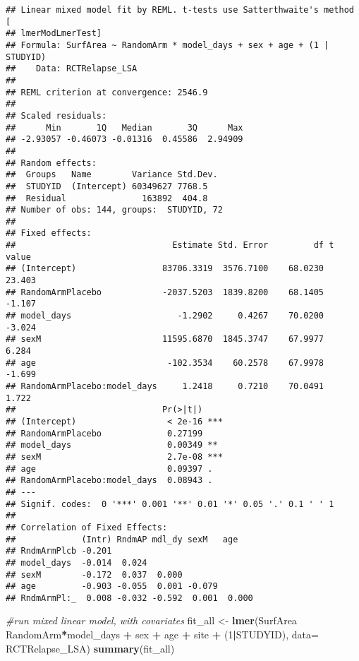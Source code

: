\documentclass[]{article}
\newenvironment{Shaded}{\begin{snugshade}}{\end{snugshade}}
\newcommand{\KeywordTok}[1]{\textcolor[rgb]{0.13,0.29,0.53}{\textbf{#1}}}
\newcommand{\DataTypeTok}[1]{\textcolor[rgb]{0.13,0.29,0.53}{#1}}
\newcommand{\DecValTok}[1]{\textcolor[rgb]{0.00,0.00,0.81}{#1}}
\newcommand{\StringTok}[1]{\textcolor[rgb]{0.31,0.60,0.02}{#1}}
\newcommand{\CommentTok}[1]{\textcolor[rgb]{0.56,0.35,0.01}{\textit{#1}}}
\newcommand{\OperatorTok}[1]{\textcolor[rgb]{0.81,0.36,0.00}{\textbf{#1}}}
\newcommand{\NormalTok}[1]{#1}
\theoremstyle{definition}
\theoremstyle{definition}
\theoremstyle{definition}
\theoremstyle{remark}
\begin{document}
\begin{verbatim}
## Linear mixed model fit by REML. t-tests use Satterthwaite's method [
## lmerModLmerTest]
## Formula: SurfArea ~ RandomArm * model_days + sex + age + (1 | STUDYID)
##    Data: RCTRelapse_LSA
## 
## REML criterion at convergence: 2546.9
## 
## Scaled residuals: 
##      Min       1Q   Median       3Q      Max 
## -2.93057 -0.46073 -0.01316  0.45586  2.94909 
## 
## Random effects:
##  Groups   Name        Variance Std.Dev.
##  STUDYID  (Intercept) 60349627 7768.5  
##  Residual               163892  404.8  
## Number of obs: 144, groups:  STUDYID, 72
## 
## Fixed effects:
##                               Estimate Std. Error         df t value
## (Intercept)                 83706.3319  3576.7100    68.0230  23.403
## RandomArmPlacebo            -2037.5203  1839.8200    68.1405  -1.107
## model_days                     -1.2902     0.4267    70.0200  -3.024
## sexM                        11595.6870  1845.3747    67.9977   6.284
## age                          -102.3534    60.2578    67.9978  -1.699
## RandomArmPlacebo:model_days     1.2418     0.7210    70.0491   1.722
##                             Pr(>|t|)    
## (Intercept)                  < 2e-16 ***
## RandomArmPlacebo             0.27199    
## model_days                   0.00349 ** 
## sexM                         2.7e-08 ***
## age                          0.09397 .  
## RandomArmPlacebo:model_days  0.08943 .  
## ---
## Signif. codes:  0 '***' 0.001 '**' 0.01 '*' 0.05 '.' 0.1 ' ' 1
## 
## Correlation of Fixed Effects:
##             (Intr) RndmAP mdl_dy sexM   age   
## RndmArmPlcb -0.201                            
## model_days  -0.014  0.024                     
## sexM        -0.172  0.037  0.000              
## age         -0.903 -0.055  0.001 -0.079       
## RndmArmPl:_  0.008 -0.032 -0.592  0.001  0.000
\end{verbatim}

\begin{Shaded}
\begin{Highlighting}[]
\CommentTok{#run mixed linear model, with covariates}
\NormalTok{  fit_all <-}\StringTok{ }\KeywordTok{lmer}\NormalTok{(SurfArea }\OperatorTok{~}\StringTok{ }\NormalTok{RandomArm}\OperatorTok{*}\NormalTok{model_days }\OperatorTok{+}\StringTok{ }\NormalTok{sex }\OperatorTok{+}\StringTok{ }\NormalTok{age }\OperatorTok{+}\StringTok{ }\NormalTok{site }\OperatorTok{+}\StringTok{ }\NormalTok{(}\DecValTok{1}\OperatorTok{|}\NormalTok{STUDYID), }\DataTypeTok{data=}\NormalTok{ RCTRelapse_LSA)}
  \KeywordTok{summary}\NormalTok{(fit_all)}
\end{Highlighting}
\end{Shaded}
\end{document}

